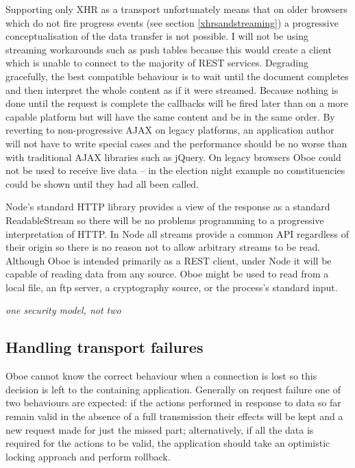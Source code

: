 \documentclass[12pt, ]{article}
\begin{document}
Supporting only XHR as a transport unfortunately means that on older
browsers which do not fire progress events (see section
\ref{xhrsandstreaming}) a progressive conceptualisation of the data
transfer is not possible. I will not be using streaming workarounds such
as push tables because this would create a client which is unable to
connect to the majority of REST services. Degrading gracefully, the best
compatible behaviour is to wait until the document completes and then
interpret the whole content as if it were streamed. Because nothing is
done until the request is complete the callbacks will be fired later
than on a more capable platform but will have the same content and be in
the same order. By reverting to non-progressive AJAX on legacy
platforms, an application author will not have to write special cases
and the performance should be no worse than with traditional AJAX
libraries such as jQuery. On legacy browsers Oboe could not be used to
receive live data -- in the election night example no constituencies
could be shown until they had all been called.

Node's standard HTTP library provides a view of the response as a
standard ReadableStream so there will be no problems programming to a
progressive interpretation of HTTP. In Node all streams provide a common
API regardless of their origin so there is no reason not to allow
arbitrary streams to be read. Although Oboe is intended primarily as a
REST client, under Node it will be capable of reading data from any
source. Oboe might be used to read from a local file, an ftp server, a
cryptography source, or the process's standard input.

\emph{one security model, not two}

\subsection{Handling transport
failures}\label{handling-transport-failures}

Oboe cannot know the correct behaviour when a connection is lost so this
decision is left to the containing application. Generally on request
failure one of two behaviours are expected: if the actions performed in
response to data so far remain valid in the absence of a full
transmission their effects will be kept and a new request made for just
the missed part; alternatively, if all the data is required for the
actions to be valid, the application should take an optimistic locking
approach and perform rollback.
\end{document}
